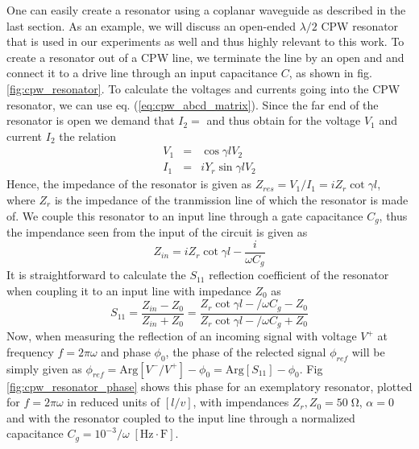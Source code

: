One can easily create a resonator using a coplanar waveguide as described in the last section. As an example, we will discuss an open-ended $\lambda / 2$ CPW resonator that is used in our experiments as well and thus highly relevant to this work. To create a resonator out of a CPW line, we terminate the line by an open and and connect it to a drive line through an input capacitance $C$, as shown in fig. \ref{fig:cpw_resonator}. To calculate the voltages and currents going into the CPW resonator, we can use eq. (\ref{eq:cpw_abcd_matrix}). Since the far end of the resonator is open we demand that $I_2=$ and thus obtain for the voltage $V_1$ and current $I_2$ the relation
%
\begin{eqnarray}
V_1 & = & \cos{\gamma l} V_2 \\
I_1 & = & i Y_r \sin{\gamma l} V_2
\end{eqnarray}
%
Hence, the impedance of the resonator is given as $Z_{res} = V_1/I_1 = i Z_r \cot{\gamma l}$, where $Z_r$ is the impedance of the tranmission line of which the resonator is made of. We couple this resonator to an input line through a gate capacitance $C_g$, thus the impendance seen from the input of the circuit is given as
%
\begin{equation}
Z_{in} = i Z_r \cot{\gamma l}-\frac{i}{\omega C_g} \label{eq:cpw_impedance}
\end{equation}
%
It is straightforward to calculate the $S_{11}$ reflection coefficient of the resonator when coupling it to an input line with impedance $Z_0$ as
%
\begin{equation}
S_{11} = \frac{Z_{in}-Z_0}{Z_{in}+Z_0} = \frac{Z_r\cot{\gamma l}-/\omega C_g-Z_0}{Z_r\cot{\gamma l}-/\omega C_g + Z_0}
\end{equation}
%
Now, when measuring the reflection of an incoming signal with voltage $V^+$ at frequency $f=2\pi \omega$ and phase $\phi_0$, the phase of the relected signal $\phi_{ref}$ will be simply given as $\phi_{ref}=\mathrm{Arg}[V^-/V^+]-\phi_0 = \mathrm{Arg}[S_{11}]-\phi_0$. Fig \ref{fig:cpw_resonator_phase} shows this phase for an exemplatory resonator, plotted for $f=2\pi\omega$ in reduced units of $[l/v]$, with impendances $Z_r,Z_0=50\;\mathrm{\Omega}$, $\alpha=0$ and with the resonator coupled to the input line through a normalized capacitance $C_g=10^{-3}/\omega\;[\mathrm{Hz}\cdot \mathrm{F}]$.

